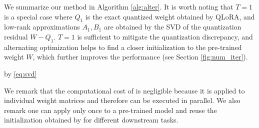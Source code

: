 We summarize our method in Algorithm \ref{alg:alter}. It is worth noting that $T=1$ is a special case where $Q_1$ is the exact quantized weight obtained by QLoRA, and low-rank approximations $A_1, B_1$ are obtained by the SVD of the quantization residual $W - Q_1$. $T=1$ is sufficient to mitigate the quantization discrepancy, and alternating optimization helps to find a closer initialization to the pre-trained weight $W$, which further improves the performance (see Section \ref{fig:num_iter}).


\begin{algorithm}
    \caption{{\OurAlg}}\label{alg:alter}
    \begin{algorithmic}[1]
             by \eqref{eq:svd}{}
            
        \ENDFOR
    \end{algorithmic}
\end{algorithm}




We remark that the computational cost of {\OurAlg} is negligible because it is applied to individual weight matrices and therefore can be executed in parallel. We also remark one can apply {\OurAlg} only once to a pre-trained model and reuse the initialization obtained by {\OurAlg} for different downstream tasks.

